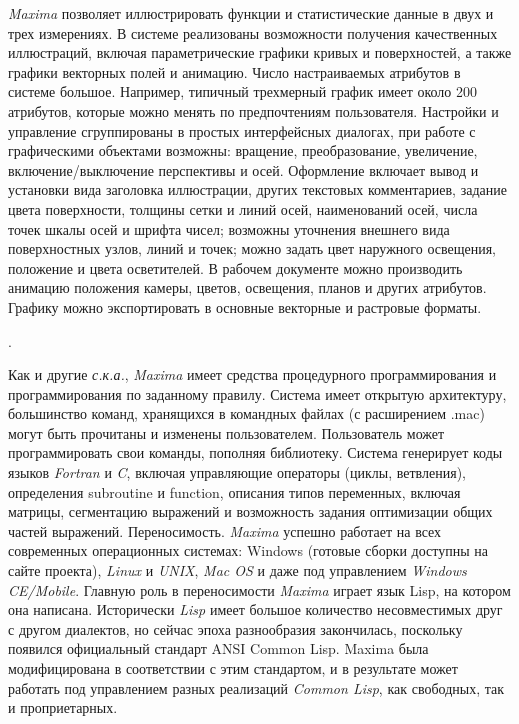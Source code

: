 \textit{Maxima} позволяет иллюстрировать функции и статистические данные в двух и трех измерениях. В системе реализованы возможности получения качественных иллюстраций, включая параметрические графики кривых и поверхностей, а также графики векторных полей и анимацию. Число настраиваемых атрибутов в системе большое. Например, типичный трехмерный график имеет около 200 атрибутов, которые можно менять по предпочтениям пользователя. Настройки и управление сгруппированы в простых интерфейсных диалогах, при работе с графическими объектами возможны: вращение, преобразование, увеличение, включение/выключение перспективы и осей. Оформление включает вывод и установки вида заголовка иллюстрации, других текстовых комментариев, задание цвета поверхности, толщины сетки и линий осей, наименований осей, числа точек шкалы осей и шрифта чисел; возможны уточнения внешнего вида поверхностных узлов, линий и точек; можно задать цвет наружного освещения, положение и цвета осветителей. В рабочем документе можно производить анимацию положения камеры, цветов, освещения, планов и других атрибутов. Графику можно экспортировать в основные векторные и растровые форматы.

. 

Как и другие \textit{с.к.а.}, \textit{Maxima} имеет средства процедурного программирования и программирования по заданному правилу. Система имеет открытую архитектуру, большинство команд, хранящихся в командных файлах (с расширением .mac) могут быть прочитаны и изменены пользователем. Пользователь может программировать свои команды, пополняя библиотеку. Система генерирует коды языков \textit{Fortran} и \textit{C}, включая управляющие операторы (циклы, ветвления), определения subroutine и function, описания типов переменных, включая матрицы, сегментацию выражений и возможность задания оптимизации общих частей выражений.
Переносимость. \textit{Maxima} успешно работает на всех современных операционных системах: Windows (готовые сборки доступны на сайте проекта), \textit{Linux} и \textit{UNIX}, \textit{Mac OS} и даже под управлением \textit{Windows CE/Mobile}. Главную роль в переносимости \textit{Maxima} играет язык Lisp, на котором она написана. Исторически \textit{Lisp} имеет большое количество несовместимых друг с другом диалектов, но сейчас эпоха разнообразия закончилась, поскольку появился официальный стандарт ANSI Common Lisp. Maxima была модифицирована в соответствии с этим стандартом, и в результате может работать под управлением разных реализаций \textit{Common Lisp}, как свободных, так и проприетарных.

